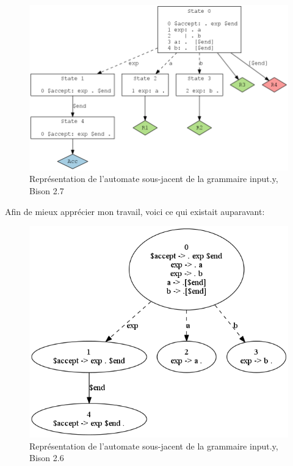 \documentclass[a4paper,11pt,twoside,final]{article}
\begin{document}
  \begin{figure}[H]
    \begin{adjustwidth}{-2cm}{-2cm}
      \begin{center}
        \includegraphics[scale=0.55]{images/badgraph}
        \caption{Représentation de l'automate sous-jacent de la grammaire
        input.y, Bison 2.7}
      \end{center}
    \end{adjustwidth}
  \end{figure}

  Afin de mieux apprécier mon travail, voici ce qui existait auparavant:

  \begin{figure}[H]
    \begin{adjustwidth}{-2cm}{-2cm}
      \begin{center}
        \includegraphics[scale=0.55]{images/old}
        \caption{Représentation de l'automate sous-jacent de la grammaire
        input.y, Bison 2.6}
      \end{center}
    \end{adjustwidth}
  \end{figure}
\end{document}
